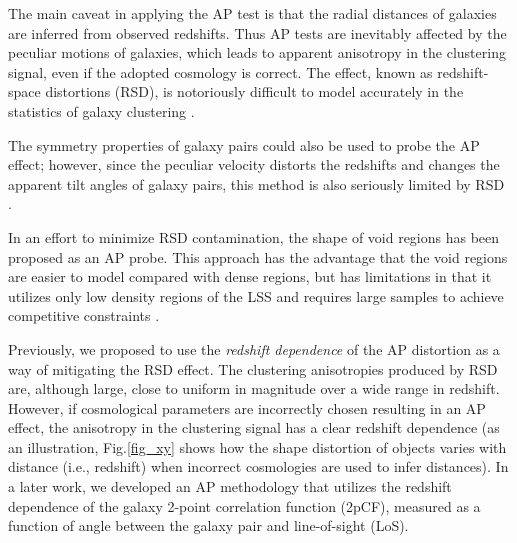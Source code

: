 \documentclass[prl,twocolumn,superscriptaddress,aps,amsmath,amssymb,nofootinbib,altaffilletter]{revtex4}
\begin{document}

The main caveat in applying the AP test is that 
the radial distances of galaxies are inferred from observed redshifts.
Thus AP tests are inevitably affected by the peculiar motions of galaxies,
which leads to apparent anisotropy in the clustering signal, even if the adopted cosmology is correct.
The effect, known as redshift-space distortions (RSD),
is notoriously difficult to model accurately in the statistics of galaxy clustering \citep{Ballinger1996}.

The symmetry properties of galaxy pairs\cite{Marinoni2010}  could also be used to probe the AP effect;
however, since the peculiar velocity distorts the redshifts and changes the apparent tilt angles of galaxy pairs,
this method is also seriously limited by RSD \citep{Jennings2011}.

In an effort to minimize RSD contamination, the shape of void regions\cite{Ryden1995,LavausWandelt1995}  has been 
proposed as an AP probe. This approach has the advantage that the void regions are easier to model compared with dense regions, but has limitations in that it utilizes only low density regions of the LSS and requires large samples to achieve competitive constraints \citep{Qingqing2016}.


Previously, we proposed to use the {\it redshift dependence} of the AP distortion\cite{Li2014} as a way of mitigating the RSD effect. The clustering anisotropies produced by RSD are, although large, close to uniform in magnitude over a wide range in redshift.  However, if cosmological parameters are incorrectly chosen resulting in an AP effect, 
the anisotropy in the clustering signal has a clear redshift dependence
(as an illustration, Fig.\ref{fig_xy} shows how the shape distortion of objects varies with distance (i.e., redshift) 
when incorrect cosmologies are used to infer distances).
In a later work\cite{Li2015}, we developed an AP methodology 
that utilizes the redshift dependence of the galaxy 2-point correlation function (2pCF), 
measured as a function of angle between the galaxy pair and line-of-sight (LoS).
\end{document}
